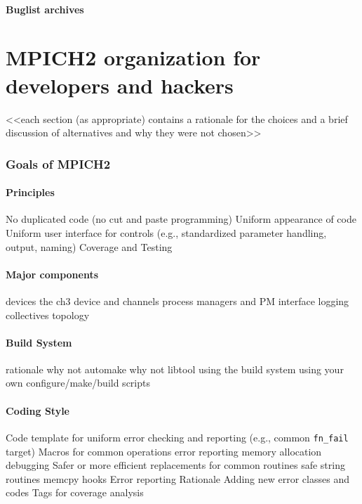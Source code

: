 \documentclass{article}
\begin{document}
\subsection{Buglist archives}


\part{MPICH2 organization for developers and hackers}


    <<each section (as appropriate) contains a rationale for the choices and a brief discussion of alternatives and why they were not chosen>>

\section{Goals of MPICH2}


\subsection{Principles}
         No duplicated code (no cut and paste programming) 
         Uniform appearance of code
         Uniform user interface for controls (e.g., standardized parameter handling, output, naming)
         Coverage and Testing

\subsection{Major components}
         devices
              the ch3 device and channels
         process managers and PM interface
         logging
         collectives
         topology

\subsection{Build System}
         rationale
              why not automake
              why not libtool
         using the build system
         using your own configure/make/build scripts

\subsection{Coding Style}
         Code template for uniform error checking and reporting (e.g., common \texttt{fn\_fail} target)
         Macros for common operations
              error reporting
              memory allocation
              debugging
         Safer or more efficient replacements for common routines
              safe string routines
              memcpy hooks
         Error reporting
              Rationale
               Adding new error classes and codes
         Tags for coverage analysis
\end{document}
